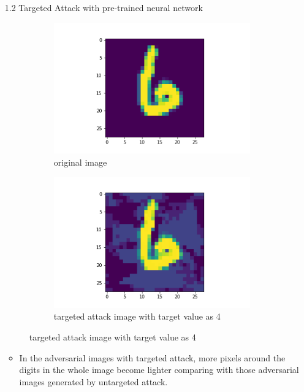 \documentclass{article}
\begin{document}
\begin{enumerate}
        \item[1.2] 
    	Targeted Attack with pre-trained neural network\\
     	\begin{figure}[H]
     	\centering
     	\begin{subfigure}[b]{0.45\textwidth}
         	\centering
         	\includegraphics[width=\textwidth]
         	{image/No.2 original test_image.png}
         	\caption{original image}
         	\label{fig:Hyperplane Epoch 0}
     	\end{subfigure}
     	\hfill
     	\begin{subfigure}[b]{0.45\textwidth}
         	\centering
         	\includegraphics[width=\textwidth]
         	{image/No.2 perturbed test_image.png}
         	\caption{targeted attack image with target value as 4}
         	\label{fig:Hyperplane Epoch 1000}
     	\end{subfigure}
     	\end{figure}
     	\begin{itemize}
     	\item
     	In the adversarial images with targeted attack, more pixels around the digits in the whole image become lighter comparing with those adversarial images generated by untargeted attack.
        \end{itemize}
        

\end{enumerate}
\end{document}
